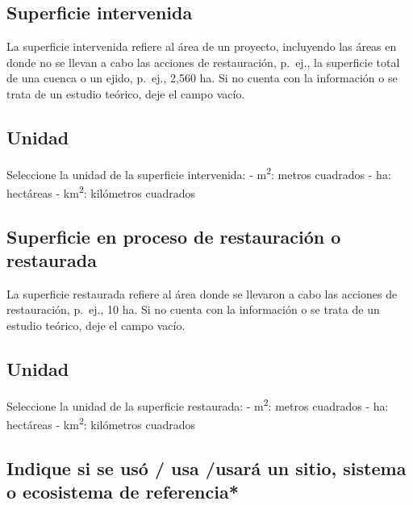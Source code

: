 \documentclass[
]{book}
\begin{document}
\hypertarget{superficie-intervenida}{%
\subsection{Superficie intervenida}\label{superficie-intervenida}}

La superficie intervenida refiere al área de un proyecto, incluyendo las áreas en donde no se llevan a cabo las acciones de restauración, p.~ej., la superficie total de una cuenca o un ejido, p.~ej., 2,560 ha.
Si no cuenta con la información o se trata de un estudio teórico, deje el campo vacío.

\hypertarget{unidad}{%
\subsection{Unidad}\label{unidad}}

Seleccione la unidad de la superficie intervenida: - m\textsuperscript{2}: metros cuadrados - ha: hectáreas - km\textsuperscript{2}: kilómetros cuadrados

\hypertarget{superficie-en-proceso-de-restauraciuxf3n-o-restaurada}{%
\subsection{Superficie en proceso de restauración o restaurada}\label{superficie-en-proceso-de-restauraciuxf3n-o-restaurada}}

La superficie restaurada refiere al área donde se llevaron a cabo las acciones de restauración, p.~ej., 10 ha.
Si no cuenta con la información o se trata de un estudio teórico, deje el campo vacío.

\hypertarget{unidad-1}{%
\subsection{Unidad}\label{unidad-1}}

Seleccione la unidad de la superficie restaurada: - m\textsuperscript{2}: metros cuadrados - ha: hectáreas - km\textsuperscript{2}: kilómetros cuadrados

\hypertarget{indique-si-se-usuxf3-usa-usaruxe1-un-sitio-sistema-o-ecosistema-de-referencia}{%
\subsection{Indique si se usó / usa /usará un sitio, sistema o ecosistema de referencia*}\label{indique-si-se-usuxf3-usa-usaruxe1-un-sitio-sistema-o-ecosistema-de-referencia}}
\end{document}
